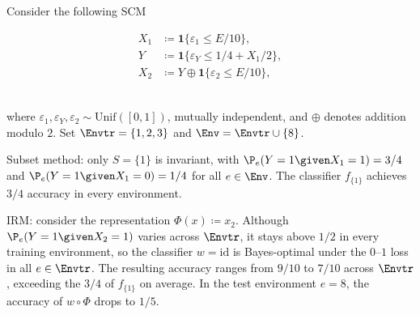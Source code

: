 \begin{example} \label{ex:irm-vs-subset}
Consider the following SCM\\[0pt]
\begin{minipage}{0.49\textwidth}
\begin{align*}
    X_1 &\coloneq \bm{1}\{\varepsilon_1 \leq E/10\}, \\
    Y &\coloneq \bm{1}\{\varepsilon_Y \leq 1/4 + X_1/2\}, \\
    X_2 &\coloneq Y \oplus \bm{1}\{\varepsilon_2 \leq E/10\},
\end{align*}
\end{minipage}
\begin{minipage}{0.49\textwidth}
\centering
\vspace*{0.7em}

\end{minipage}\\[6pt]
where $\varepsilon_1, \varepsilon_Y, \varepsilon_2 \sim \mathrm{Unif}([0,1])$, mutually independent, and $\oplus$ denotes addition modulo $2$. Set $\Envtr = \{1, 2, 3\}$ and $\Env = \Envtr \cup \{8\}$.

Subset method: only $S = \{1\}$ is invariant, with $\P_e(Y = 1 \given X_1 = 1) = 3/4$ and $\P_e(Y = 1 \given X_1 = 0) = 1/4$ for all $e \in \Env$. The classifier $f_{\{1\}}$ achieves $3/4$ accuracy in every environment.

IRM: consider the representation $\Phi(x) \coloneq x_2$. Although $\P_e(Y = 1 \given X_2 = 1)$ varies across $\Envtr$, it stays above $1/2$ in every training environment, so the classifier $w = \mathrm{id}$ is Bayes-optimal under the $0$--$1$ loss in all $e \in \Envtr$.
The resulting accuracy ranges from $9/10$ to $7/10$ across $\Envtr$, exceeding the $3/4$ of $f_{\{1\}}$ on average. In the test environment $e = 8$, the accuracy of $w \circ \Phi$ drops to $1/5$.
\end{example}



